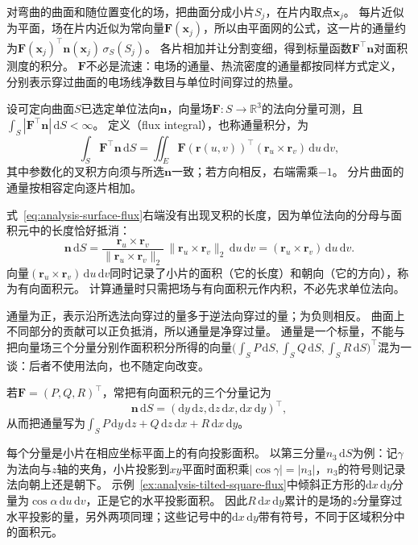 对弯曲的曲面和随位置变化的场，把曲面分成小片$S_j$，在片内取点$\bm x_j$。
每片近似为平面，场在片内近似为常向量$\bm F(\bm x_j)$，所以由平面网的公式，这一片的通量约为$\bm F(\bm x_j)^\top\bm n(\bm x_j)\,\sigma_S(S_j)$。
各片相加并让分割变细，得到标量函数$\bm F^\top\bm n$对面积测度的积分。
$\bm F$不必是流速：电场的通量、热流密度的通量都按同样方式定义，分别表示穿过曲面的电场线净数目与单位时间穿过的热量。

\begin{definition}[第二类曲面积分]
\label{def:analysis-surface-flux-integral}
设可定向曲面$S$已选定单位法向$\bm n$，向量场$\bm F:S\to\mathbb R^3$的法向分量可测，且
$\int_S|\bm F^\top\bm n|\,\mathrm dS<\infty$。
定义（flux integral），也称通量积分，为
\begin{equation}
 \int_S\bm F^\top\bm n\,\mathrm dS
 =\iint_E\bm F(\bm r(u,v))^\top(\bm r_u\times\bm r_v)\,\mathrm du\,\mathrm dv,
 \label{eq:analysis-surface-flux}
\end{equation}
其中参数化的叉积方向须与所选$\bm n$一致；若方向相反，右端需乘$-1$。
分片曲面的通量按相容定向逐片相加。
\end{definition}

式~\eqref{eq:analysis-surface-flux}右端没有出现叉积的长度，因为单位法向的分母与面积元中的长度恰好抵消：
\[
 \bm n\,\mathrm dS
 =\frac{\bm r_u\times\bm r_v}{\lVert\bm r_u\times\bm r_v\rVert_2}\,\lVert\bm r_u\times\bm r_v\rVert_2\,\mathrm du\,\mathrm dv
 =(\bm r_u\times\bm r_v)\,\mathrm du\,\mathrm dv.
\]
向量$(\bm r_u\times\bm r_v)\,\mathrm du\,\mathrm dv$同时记录了小片的面积（它的长度）和朝向（它的方向），称为有向面积元。
计算通量时只需把场与有向面积元作内积，不必先求单位法向。

通量为正，表示沿所选法向穿过的量多于逆法向穿过的量；为负则相反。
曲面上不同部分的贡献可以正负抵消，所以通量是净穿过量。
通量是一个标量，不能与把向量场三个分量分别作面积积分所得的向量$\bigl(\int_SP\,\mathrm dS,\int_SQ\,\mathrm dS,\int_SR\,\mathrm dS\bigr)^\top$混为一谈：后者不使用法向，也不随定向改变。

若$\bm F=(P,Q,R)^\top$，常把有向面积元的三个分量记为
\[
 \bm n\,\mathrm dS=(\mathrm dy\,\mathrm dz,\mathrm dz\,\mathrm dx,\mathrm dx\,\mathrm dy)^\top,
\]
从而把通量写为$\int_SP\,\mathrm dy\,\mathrm dz+Q\,\mathrm dz\,\mathrm dx+R\,\mathrm dx\,\mathrm dy$。

每个分量是小片在相应坐标平面上的有向投影面积。
以第三分量$n_3\,\mathrm dS$为例：记$\gamma$为法向与$z$轴的夹角，小片投影到$xy$平面时面积乘$|\cos\gamma|=|n_3|$，$n_3$的符号则记录法向朝上还是朝下。
示例~\ref{ex:analysis-tilted-square-flux}中倾斜正方形的$\mathrm dx\,\mathrm dy$分量为$\cos\alpha\,\mathrm du\,\mathrm dv$，正是它的水平投影面积。
因此$R\,\mathrm dx\,\mathrm dy$累计的是场的$z$分量穿过水平投影的量，另外两项同理；这些记号中的$\mathrm dx\,\mathrm dy$带有符号，不同于区域积分中的面积元。

